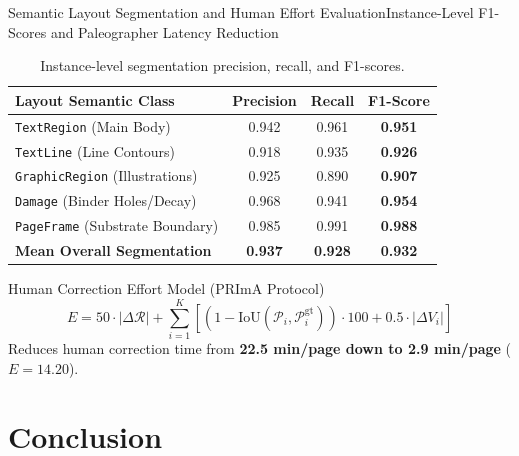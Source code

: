 \documentclass[
  aspectratio=169,
]{beamer}
\begin{document}
\begin{frame}{Semantic Layout Segmentation and Human Effort Evaluation}{Instance-Level F1-Scores and Paleographer Latency Reduction}
\begin{table}
  \centering
  \small
  \begin{tabular}{lccc}
    \toprule
    \textbf{Layout Semantic Class} & \textbf{Precision} & \textbf{Recall} & \textbf{F1-Score} \\
    \midrule
    \texttt{TextRegion} (Main Body) & 0.942 & 0.961 & \textbf{0.951} \\
    \texttt{TextLine} (Line Contours) & 0.918 & 0.935 & \textbf{0.926} \\
    \texttt{GraphicRegion} (Illustrations) & 0.925 & 0.890 & \textbf{0.907} \\
    \texttt{Damage} (Binder Holes/Decay) & 0.968 & 0.941 & \textbf{0.954} \\
    \texttt{PageFrame} (Substrate Boundary) & 0.985 & 0.991 & \textbf{0.988} \\
    \midrule
    \textbf{Mean Overall Segmentation} & \textbf{0.937} & \textbf{0.928} & \textbf{0.932} \\
    \bottomrule
  \end{tabular}
  \caption{Instance-level segmentation precision, recall, and F1-scores.}
\end{table}
\begin{block}{Human Correction Effort Model (PRImA Protocol)}
\[
  E = 50 \cdot |\Delta \mathcal{R}| + \sum_{i=1}^K \left[ (1 - \text{IoU}(\mathcal{P}_i, \mathcal{P}_i^{\text{gt}})) \cdot 100 + 0.5 \cdot |\Delta V_i| \right]
\]
Reduces human correction time from \textbf{22.5 min/page down to 2.9 min/page} ($E=14.20$).
\end{block}
\end{frame}

\section{Conclusion}
\end{document}
